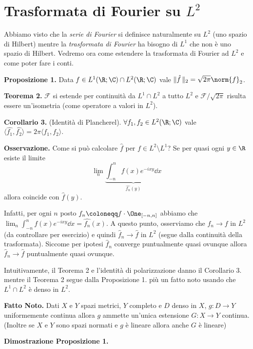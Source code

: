 
\section{Trasformata di Fourier su $L^2$}

Abbiamo visto che la \textit{serie di Fourier} si definisce naturalmente su $L^2$ (uno spazio di Hilbert) mentre la \textit{trasformata di Fourier} ha bisogno di $L^1$ che non è uno spazio di Hilbert. Vedremo ora come estendere la trasformata di Fourier ad $L^2$ e come poter fare i conti.

\textbf{Proposizione 1.}
Data $f \in L^1(\R; \C) \cap L^2(\R; \C)$ vale $\| \hat f\, \|_2 = \sqrt{2\pi} \norm{f}_2$.

\textbf{Teorema 2.}
$\mathcal F$ si estende per continuità da $L^1 \cap L^2$ a tutto $L^2$ e $\mathcal F / \sqrt{2\pi}$ risulta essere un'isometria (come operatore a valori in $L^2$).

\textbf{Corollario 3.} (Identità di Plancherel).
$\forall f_1, f_2 \in L^2(\R; \C)$ vale $\langle \hat{f_1}, \hat{f_2} \rangle = 2\pi \langle f_1, f_2 \rangle$.

\textbf{Osservazione.}
Come si può calcolare $\hat f$ per $f \in L^2 \setminus L^1$? Se per quasi ogni $y \in \R$ esiste il limite
$$
\lim_n \underbrace{\int_{-n}^{n} f(x) e^{-ixy} \dd x}_{\hat{f_n}(y)}
$$
allora coincide con $\hat f(y)$.

Infatti, per ogni $n$ posto $f_n \coloneqq f \cdot \One_{[-n, n]}$ abbiamo che $\lim_n \int_{-n}^n f(x) e^{-ixy} \dd x = \hat{f_n}(x)$.
A questo punto, osserviamo che $f_n \to f$ in $L^2$ (da controllare per esercizio) e quindi $\hat f_n \to \hat f$ in $L^2$ (segue dalla continuità della trasformata). Siccome per ipotesi $\hat f_n$ converge puntualmente quasi ovunque allora $\hat f_n \to \hat f$ puntualmente quasi ovunque.

Intuitivamente, il Teorema 2 e l'identità di polarizzazione danno il Corollario 3. mentre il Teorema 2 segue dalla Proposizione 1. più un fatto noto usando che $L^1 \cap L^2$ è denso in $L^2$.

\textbf{Fatto Noto.} Dati $X$ e $Y$ spazi metrici, $Y$ completo e $D$ denso in $X$, $g \colon D \to Y$ uniformemente continua allora $g$ ammette un'unica estensione $G \colon X \to Y$ continua. (Inoltre se $X$ e $Y$ sono spazi normati e $g$ è lineare allora anche $G$ è lineare)

\textbf{Dimostrazione Proposizione 1.}

